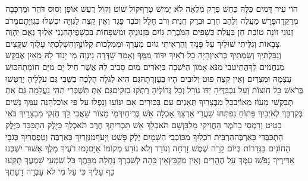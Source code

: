 \documentclass[../main/main.tex]{subfiles}
\begin{document}
\begin{multicols}{\ncols}
הוֹי עִיר דָּמִים כֻּלָּהּ כַּחַשׁ פֶּרֶק מְלֵאָה לֹא יָמִישׁ טָרֶף\PreVerseSpace{}קוֹל שׁוֹט וְקוֹל רַעַשׁ אוֹפָן וְסוּס דֹּהֵר וּמֶרְכָּבָה מְרַקֵּדָה\PreVerseSpace{}פָּרָשׁ מַעֲלֶה וְלַהַב חֶרֶב וּבְרַק חֲנִית וְרֹב חָלָל וְכֹבֶד פָּגֶר וְאֵין קֵצֶה לַגְּוִיָּה יִכְשְׁלוּ בִּגְוִיָּתָם\PreVerseSpace{}מֵרֹב זְנוּנֵי זוֹנָה טוֹבַת חֵן בַּעֲלַת כְּשָׁפִים הַמֹּכֶרֶת גּוֹיִם בִּזְנוּנֶיהָ וּמִשְׁפָּחוֹת בִּכְשָׁפֶיהָ\PreVerseSpace{}הִנְנִי אֵלַיִךְ נְאֻם יַהְוֶה צְבָאוֹת וְגִלֵּיתִי שׁוּלַיִךְ עַל פָּנָיִךְ וְהַרְאֵיתִי גוֹיִם מַעְרֵךְ וּמַמְלָכוֹת קְלוֹנֵךְ\PreVerseSpace{}וְהִשְׁלַכְתִּי עָלַיִךְ שִׁקֻּצִים וְנִבַּלְתִּיךְ וְשַׂמְתִּיךְ כְּרֹאִי\PreVerseSpace{}וְהָיָה כָל רֹאַיִךְ יִדּוֹד מִמֵּךְ וְאָמַר שָׁדְּדָה נִינְוֵה מִי יָנוּד לָהּ מֵאַיִן אֲבַקֵּשׁ מְנַחֲמִים לָךְ\PreVerseSpace{}הֲתֵיטְבִי מִנֹּא אָמוֹן הַיֹּשְׁבָה בַּיְאֹרִים מַיִם סָבִיב לָהּ אֲשֶׁר חֵיל יָם מִיָּם חוֹמָתָהּ\PreVerseSpace{}כּוּשׁ עָצְמָהּ\SubEnd{} וּמִצְרַיִם וְאֵין קֵצֶה פּוּט וְלוּבִים הָיוּ בְּעֶזְרָתָהּ\SubEnd{}\PreVerseSpace{}גַּם הִיא לַגֹּלָה הָלְכָה בַשֶּׁבִי גַּם עֹלָלֶיהָ יְרֻטְּשׁוּ בְּרֹאשׁ כָּל חוּצוֹת וְעַל נִכְבַּדֶּיהָ יַדּוּ גוֹרָל וְכָל גְּדוֹלֶיהָ רֻתְּקוּ בַזִּקִּים\PreVerseSpace{}גַּם אַתְּ תִּשְׁכְּרִי תְּהִי נַעֲלָמָה גַּם אַתְּ תְּבַקְשִׁי מָעוֹז מֵאוֹיֵב\PreVerseSpace{}כָּל מִבְצָרַיִךְ תְּאֵנִים עִם בִּכּוּרִים אִם יִנּוֹעוּ וְנָפְלוּ עַל פִּי אוֹכֵל\PreVerseSpace{}הִנֵּה עַמֵּךְ נָשִׁים בְּקִרְבֵּךְ לְאֹיְבַיִךְ פָּתוֹחַ נִפְתְּחוּ שַׁעֲרֵי אַרְצֵךְ אָכְלָה אֵשׁ בְּרִיחָיִךְ\PreVerseSpace{}מֵי מָצוֹר שַׁאֲבִי לָךְ חַזְּקִי מִבְצָרָיִךְ בֹּאִי בַטִּיט וְרִמְסִי בַחֹמֶר הַחֲזִיקִי מַלְבֵּן\PreVerseSpace{}שָׁם תֹּאכְלֵךְ אֵשׁ תַּכְרִיתֵךְ חֶרֶב תֹּאכְלֵךְ כַּיָּלֶק הִתְכַּבֵּד כַּיֶּלֶק הִתְכַּבְּדִי כָּאַרְבֶּה\PreVerseSpace{}הִרְבֵּית רֹכְלַיִךְ מִכּוֹכְבֵי הַשָּׁמָיִם יֶלֶק פָּשַׁט וַיָּעֹף\PreVerseSpace{}מִנְּזָרַיִךְ כָּאַרְבֶּה וְטַפְסְרַיִךְ כְּגֹבָי\SubEnd{} הַחוֹנִים בַּגְּדֵרוֹת בְּיוֹם קָרָה שֶׁמֶשׁ זָרְחָה וְנוֹדַד וְלֹא נוֹדַע מְקוֹמוֹ אַיָּם\PreVerseSpace{}נָמוּ רֹעֶיךָ מֶלֶךְ אַשּׁוּר יִשְׁכְּנוּ אַדִּירֶיךָ נָפֹשׁוּ עַמְּךָ עַל הֶהָרִים וְאֵין מְקַבֵּץ\PreVerseSpace{}אֵין כֵּהָה לְשִׁבְרֶךָ נַחְלָה מַכָּתֶךָ כֹּל שֹׁמְעֵי שִׁמְעֲךָ תָּקְעוּ כַף עָלֶיךָ כִּי עַל מִי לֹא עָבְרָה רָעָתְךָ\par
\pagebreak
\end{multicols}
\end{document}
